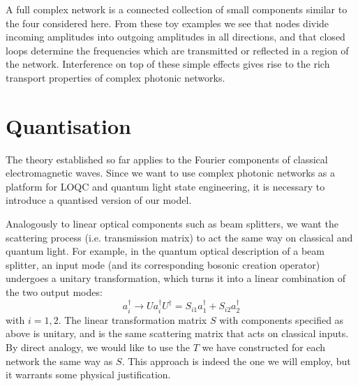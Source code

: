 A full complex network is a connected collection of small components similar to the four considered here. From these toy examples we see that nodes divide incoming amplitudes into outgoing amplitudes in all directions, and that closed loops determine the frequencies which are transmitted or reflected in a region of the network. Interference on top of these simple effects gives rise to the rich transport properties of complex photonic networks.  


\section{Quantisation}
The theory established so far applies to the Fourier components of classical electromagnetic waves. Since we want to use complex photonic networks as a platform for LOQC and quantum light state engineering, it is necessary to introduce a quantised version of our model.

Analogously to linear optical components such as beam splitters, we want the scattering process (i.e. transmission matrix) to act the same way on classical and quantum light. For example, in the quantum optical description of a beam splitter, an input mode (and its corresponding bosonic creation operator) undergoes a unitary transformation, which turns it into a linear combination of the two output modes:
\begin{equation}
    \label{eq:beamsplitter}
    a_i^\dagger \rightarrow Ua_i^\dagger U^\dagger = S_{i1}a_1^\dagger + S_{i2}a_2^\dagger
\end{equation}
with $i=1,2$. The linear transformation matrix $S$ with components specified as above is unitary, and is the same scattering matrix that acts on classical inputs. By direct analogy, we would like to use the $T$ we have constructed for each network the same way as $S$. This approach is indeed the one we will employ, but it warrants some physical justification.



\cite{Zandi2012}
